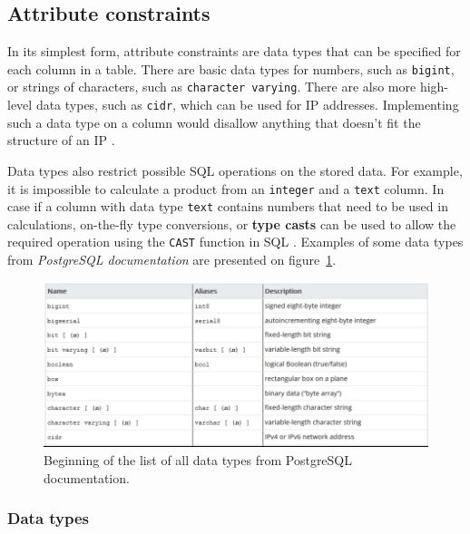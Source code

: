 \documentclass[11pt]{article}
\begin{document}
    \subsection{Attribute constraints} \label{subsec:att_constr}

    In its simplest form, attribute constraints are data types that can be specified for each column in a table.
    There are basic data types for numbers, such as \texttt{bigint}, or strings of characters, such as \texttt{character varying}.
    There are also more high-level data types, such as \texttt{cidr}, which can be used for IP addresses.
    Implementing such a data type on a column would disallow anything that doesn't fit the structure of an IP .

    Data types also restrict possible SQL operations on the stored data.
    For example, it is impossible to calculate a product from an \texttt{integer} and a \texttt{text} column.
    In case if a column with data type \texttt{text} contains numbers that need to be used in calculations, on-the-fly type conversions, or \textbf{type casts} can be used to allow the required operation using the \texttt{CAST} function in SQL .
    Examples of some data types from \textit{PostgreSQL documentation}\cite{ThePostgreSQLGlobalDevelopmentGroup2019} are presented on figure~\ref{fig:dtypes}.

    \begin{figure}[hbt!]
        \centering
        \includegraphics[width=1\linewidth,trim=1 1 1 1,clip]{img/dtypes.png}
        \caption{Beginning of the list of all data types from PostgreSQL documentation\cite{ThePostgreSQLGlobalDevelopmentGroup2019}.}
        \label{fig:dtypes}
    \end{figure}

    \subsubsection{Data types} \label{subsubsec:dtypes}
\end{document}
